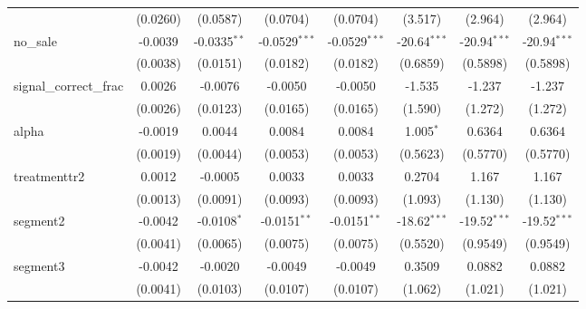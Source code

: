 \begin{tabular}{lccccccc}
                                    & (0.0260)              & (0.0587)       & (0.0704)        & (0.0704)        & (3.517)         & (2.964)         & (2.964)\\   
   no\_sale                         & -0.0039               & -0.0335$^{**}$ & -0.0529$^{***}$ & -0.0529$^{***}$ & -20.64$^{***}$  & -20.94$^{***}$  & -20.94$^{***}$\\   
                                    & (0.0038)              & (0.0151)       & (0.0182)        & (0.0182)        & (0.6859)        & (0.5898)        & (0.5898)\\   
   signal\_correct\_frac            & 0.0026                & -0.0076        & -0.0050         & -0.0050         & -1.535          & -1.237          & -1.237\\   
                                    & (0.0026)              & (0.0123)       & (0.0165)        & (0.0165)        & (1.590)         & (1.272)         & (1.272)\\   
   alpha                            & -0.0019               & 0.0044         & 0.0084          & 0.0084          & 1.005$^{*}$     & 0.6364          & 0.6364\\   
                                    & (0.0019)              & (0.0044)       & (0.0053)        & (0.0053)        & (0.5623)        & (0.5770)        & (0.5770)\\   
   treatmenttr2                     & 0.0012                & -0.0005        & 0.0033          & 0.0033          & 0.2704          & 1.167           & 1.167\\   
                                    & (0.0013)              & (0.0091)       & (0.0093)        & (0.0093)        & (1.093)         & (1.130)         & (1.130)\\   
   segment2                         & -0.0042               & -0.0108$^{*}$  & -0.0151$^{**}$  & -0.0151$^{**}$  & -18.62$^{***}$  & -19.52$^{***}$  & -19.52$^{***}$\\   
                                    & (0.0041)              & (0.0065)       & (0.0075)        & (0.0075)        & (0.5520)        & (0.9549)        & (0.9549)\\   
   segment3                         & -0.0042               & -0.0020        & -0.0049         & -0.0049         & 0.3509          & 0.0882          & 0.0882\\   
                                    & (0.0041)              & (0.0103)       & (0.0107)        & (0.0107)        & (1.062)         & (1.021)         & (1.021)\\   

\end{tabular}
